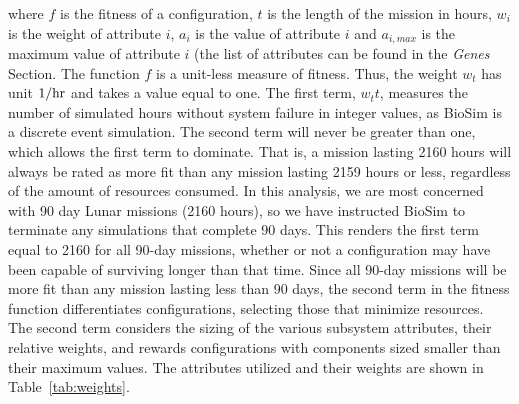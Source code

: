 \documentclass[submit]{aiaa}
\begin{document}
\noindent where $f$ is the fitness of a configuration,
$t$ is the length of the mission in hours, $w_i$ is the weight of attribute
$i$, $a_i$ is the value of attribute $i$ and $a_{i,max}$ is the
maximum value of attribute $i$ (the list of attributes can be found in the \emph{Genes} Section.
The function $f$ is a unit-less measure
of fitness.
Thus, the weight $w_t$ has unit $1/{\rm hr}$ and takes a
value equal to one. 
The first term, $w_tt$, measures the number of simulated hours without system failure in integer values, as BioSim is a
discrete event simulation. The second term will never be greater than
one, which allows the first term to dominate.  
That is, a mission lasting 2160 hours will always be rated as more fit than any mission lasting 2159 hours or less, regardless of the amount of resources consumed.  
In this analysis, we are most concerned with 90 day Lunar
missions (2160 hours), so we have instructed BioSim to terminate any
simulations that complete 90 days.  
This renders the first term equal to 2160 for all 90-day missions, whether or not a configuration may have been capable of surviving longer than that time. 
Since all 90-day missions will be more fit than any mission lasting less than 90 days, the second term in the fitness function differentiates configurations, selecting those that minimize resources.  
The second term considers the sizing of the various subsystem attributes, their
relative weights, and rewards configurations with components sized
smaller than their maximum values.  The attributes utilized and their
weights are shown in Table~\ref{tab:weights}.
\end{document}
